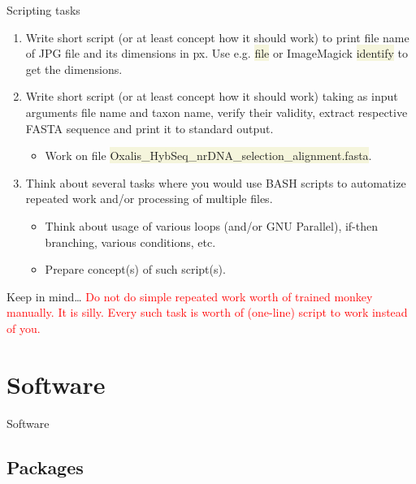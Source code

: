 \documentclass[compress, xelatex, 11pt, xcolor=svgnames, aspectratio=169,
	hyperref={
		bookmarks=true,
		unicode=true,
		colorlinks=true,
		pdftitle={Linux, command line and MetaCentrum},
		plainpages=false,
		pdfauthor={Vojtech Zeisek},
		pdfsubject={Course about use of Linux command line, writing shell scripts and using MetaCentrum of CESNET},
		pdfcreator={XeLaTeX},
		pdfkeywords={Linux, GNU, BASH, shell, command line, MetaCentrum},
		linkcolor=DarkRed, %
		anchorcolor=DarkBlue, %
		citecolor=Indigo, %
		filecolor=NavyBlue, %
		menucolor=DarkMagenta, %
		urlcolor=DarkBlue, %
		},
	url={hyphens, lowtilde} %
	]{beamer}
\renewcommand{\texttt}[1]{\colorbox{Beige}{{\ttfamily #1}}}
\renewcommand{\alert}[1]{\textcolor{red}{#1}}
\begin{document}
\begin{frame}{Scripting tasks}
	\begin{enumerate}
		\item Write short script (or at least concept how it should work) to print file name of JPG file and its dimensions in px. Use e.g. \texttt{file} or ImageMagick \texttt{identify} to get the dimensions.
		\item Write short script (or at least concept how it should work) taking as input arguments file name and taxon name, verify their validity, extract respective FASTA sequence and print it to standard output.
		\begin{itemize}
			\item Work on file \texttt{Oxalis\_HybSeq\_nrDNA\_selection\_alignment.fasta}.
		\end{itemize}
		\item Think about several tasks where you would use BASH scripts to automatize repeated work and/or processing of multiple files.
		\begin{itemize}
			\item Think about usage of various loops (and/or GNU Parallel), if-then branching, various conditions, etc.
			\item Prepare concept(s) of such script(s).
		\end{itemize}
	\end{enumerate}
	\begin{block}{Keep in mind\ldots}
		\alert{Do not do simple repeated work worth of trained monkey manually. It is silly. Every such task is worth of (one-line) script to work instead of you.}
	\end{block}
\end{frame}

\section{Software}

\begin{frame}{Software}
	\tableofcontents[currentsection, sectionstyle=show/hide, hideothersubsections]
\end{frame}

\subsection{Packages}
\end{document}
